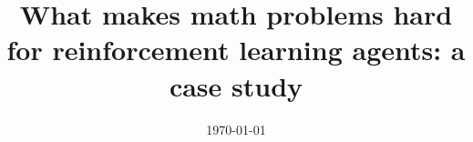 \documentclass{amsart}
\title[What makes math problems hard for RL]{What makes math problems hard for reinforcement learning agents: a case study}
\date{\today}
\begin{document}
	
	\maketitle
	\tableofcontents
	
	
	
	
	
	
	
    
	\appendix
	
	
	
	
	\sloppy
	\printbibliography
	\todos
\end{document}
